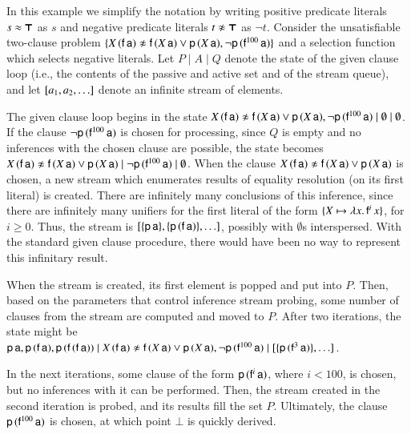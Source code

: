 \begin{exa} 
  \begin{sloppypar}
  In this example we simplify the notation by writing positive predicate literals
  $s \approx \pmb{\top}$ as $s$ and negative predicate literals $\neglit{t}$ as $\neg t$.
  Consider the unsatisfiable two-clause problem $\{ X \, (\mathsf{f} \,
  \mathsf{a}) \not\approx \mathsf{f} \, (X \, \mathsf{a}) \lor \mathsf{p} \, (X \, \mathsf{a}),\allowbreak
  \neg \mathsf{p} \, (\mathsf{f}^{100} \, \mathsf{a})  \}$ and a selection function which
  selects negative literals. 
  Let $P \mid A \mid Q$ denote
  the state of the given clause loop (i.e., the contents of the passive and active set
  and of the stream queue), and let $[ a_1, a_2, \ldots ]$
  denote an infinite stream of elements.
  \end{sloppypar}

  The given clause loop begins in the state $X \, (\mathsf{f} \, \mathsf{a}) \not\approx
  \mathsf{f} \, (X \, \mathsf{a}) \lor \mathsf{p} \, (X \, \mathsf{a}), \neg \mathsf{p} \,
  (\mathsf{f}^{100} \, \mathsf{a}) \mid \emptyset \mid \emptyset$. If the clause $\neg
  \mathsf{p} \, (\mathsf{f}^{100} \, \mathsf{a})$ is chosen for processing, since $Q$ is empty
  and no inferences with the chosen clause are possible, the state becomes $X \,
  (\mathsf{f} \, \mathsf{a}) \not\approx \mathsf{f} \, (X \, \mathsf{a}) \lor \mathsf{p} \, (X \,
  \mathsf{a}) \mid \neg \mathsf{p} \, (\mathsf{f}^{100} \, \mathsf{a}) \mid \emptyset$. When
  the clause $X \, (\mathsf{f} \, \mathsf{a}) \not\approx \mathsf{f} \, (X \, \mathsf{a}) \lor
  \mathsf{p} \, (X \, \mathsf{a})$ is chosen, a new stream which enumerates results of
  equality resolution (on its first literal) is created. There are infinitely many
  conclusions of this inference, since there are infinitely many unifiers for the
  first literal of the form $\{ X \mapsto \lambda x. \, \mathsf{f}^i \, x \}$, for
  $i \geq 0$. Thus, the stream is $[ \{\mathsf{p} \, \mathsf{a}\}, \{\mathsf{p} \, (\mathsf{f}\,\mathsf{a})\}, \ldots ]$,
  possibly with $\emptyset$s interspersed. With the standard given clause procedure,
  there would have been no way to represent this infinitary result.

  When the stream is created, its first element is popped and put into $P$. Then, based on the
  parameters that control inference stream probing, some number of clauses from
  the stream are computed and moved to $P$. After two iterations, the state might be
  $ \mathsf{p} \,
  \mathsf{a}, \mathsf{p} \, (\mathsf{f} \, \mathsf{a}), \allowbreak \mathsf{p} \, (\mathsf{f} \, (\mathsf{f} \, \mathsf{a}))   \mid X \,
  (\mathsf{f} \, \mathsf{a}) \not\approx \mathsf{f} \, (X \, \mathsf{a}) \lor \mathsf{p} \, (X \,
  \mathsf{a}), \neg \mathsf{p} \, (\mathsf{f}^{100} \, \mathsf{a}) \mid [ \{\mathsf{p} \, (\mathsf{f}^3\,\mathsf{a})\}, \ldots ]$. 
  
  In the next iterations, some clause of the form $\mathsf{p} \, (\mathsf{f}^{i} \,
  \mathsf{a})$, where $i < 100$, is chosen, but no inferences with it can be
  performed. Then, the stream created in the second iteration is probed, and its
  results fill the set $P$. Ultimately, the clause $\mathsf{p} \, (\mathsf{f}^{100} \,
  \mathsf{a})$ is chosen, at which point $\bot$ is quickly derived.
\end{exa}

